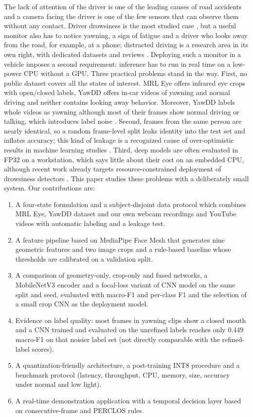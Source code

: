 \documentclass[conference]{IEEEtran}
\begin{document}
The lack of attention of the driver is one of the leading causes of road accidents and a camera facing the driver is one of the few sensors that can observe them without any contact. Driver drowsiness is the most studied case \cite{fonseca2025,fu2024,fu2024app}, but a useful monitor also has to notice yawning, a sign of fatigue and a driver who looks away from the road, for example, at a phone; distracted driving is a research area in its own right, with dedicated datasets and reviews \cite{wang2023,dontoh2025}. Deploying such a monitor in a vehicle imposes a second requirement: inference has to run in real time on a low-power CPU without a GPU.
Three practical problems stand in the way. First, no public dataset covers all the states of interest. MRL Eye \cite{mrl, fusek2018} offers infrared eye crops with open/closed labels, YawDD \cite{yawdd} offers in-car videos of yawning and normal driving and neither contains looking away behavior. Moreover, YawDD labels whole videos as yawning although most of their frames show normal driving or talking, which introduces label noise \cite{mujtaba2025}. Second, frames from the same person are nearly identical, so a random frame-level split leaks identity into the test set and inflates accuracy; this kind of leakage is a recognized cause of over-optimistic results in machine learning studies \cite{kapoor2023}. Third, deep models are often evaluated in FP32 on a workstation, which says little about their cost on an embedded CPU, although recent work already targets resource-constrained deployment of drowsiness detectors \cite{alajlan2023}.
This paper studies these problems with a deliberately small system. Our contributions are:
\begin{enumerate}
    \item A four-state formulation and a subject-disjoint data protocol which combines MRL Eye, YawDD dataset and our own webcam recordings and YouTube videos with automatic labeling and a leakage test.
    \item A feature pipeline based on MediaPipe Face Mesh that generates nine geometric features and two image crops and a rule-based baseline whose thresholds are calibrated on a validation split.
    \item A comparison of geometry-only, crop-only and fused networks, a MobileNetV3 encoder and a focal-loss variant of CNN model on the same split and seed, evaluated with macro-F1 and per-class F1 and the selection of a small crop CNN as the deployment model.
    \item Evidence on label quality: most frames in yawning clips show a closed mouth and a CNN trained and evaluated on the unrefined labels reaches only 0.449 macro-F1 on that noisier label set (not directly comparable with the refined-label scores).
    \item A quantization-friendly architecture, a post-training INT8 procedure and a benchmark protocol (latency, throughput, CPU, memory, size, accuracy under normal and low light).
    \item A real-time demonstration application with a temporal decision layer based on consecutive-frame and PERCLOS rules.
\end{enumerate}
\end{document}
